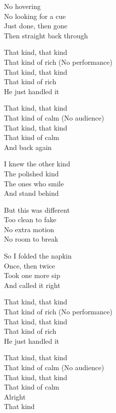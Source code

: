 \begin{lyrics}
No hovering\\
No looking for a cue\\
Just done, then gone\\
Then straight back through

That kind, that kind\\
That kind of rich
(No performance)\\
That kind, that kind\\
That kind of rich\\
He just handled it

That kind, that kind\\
That kind of calm
(No audience)\\
That kind, that kind\\
That kind of calm\\
And back again

I knew the other kind\\
The polished kind\\
The ones who smile\\
And stand behind

But this was different\\
Too clean to fake\\
No extra motion\\
No room to break

So I folded the napkin\\
Once, then twice\\
Took one more sip\\
And called it right

That kind, that kind\\
That kind of rich
(No performance)\\
That kind, that kind\\
That kind of rich\\
He just handled it

That kind, that kind\\
That kind of calm
(No audience)\\
That kind, that kind\\
That kind of calm\\
Alright\\
That kind
\end{lyrics}


